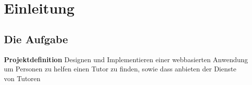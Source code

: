 \section{Einleitung} %
\subsection{Die Aufgabe} %

\begin{frame} %
	\begin{block}{\textbf{Projektdefinition}}
	  {\small Designen und Implementieren einer webbasierten Anwendung um Personen zu helfen einen Tutor zu finden, sowie dass anbieten der Dienste von Tutoren}
	\end{block}
\end{frame}
